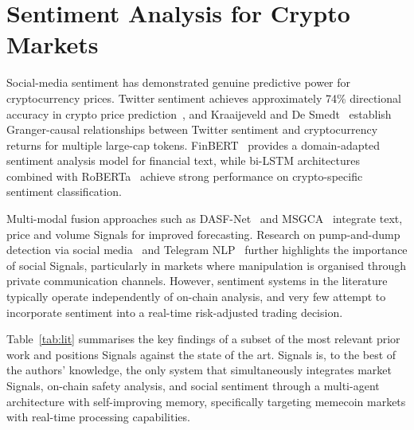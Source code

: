 \documentclass[12pt,a4paper,oneside,openany]{book}
\begin{document}
\section{Sentiment Analysis for Crypto Markets}
Social-media sentiment has demonstrated genuine predictive power for cryptocurrency prices. Twitter sentiment achieves approximately 74\% directional accuracy in crypto price prediction~\cite{ref8}, and Kraaijeveld and De Smedt~\cite{ref9} establish Granger-causal relationships between Twitter sentiment and cryptocurrency returns for multiple large-cap tokens. FinBERT~\cite{ref40} provides a domain-adapted sentiment analysis model for financial text, while bi-LSTM architectures combined with RoBERTa~\cite{ref41} achieve strong performance on crypto-specific sentiment classification.

Multi-modal fusion approaches such as DASF-Net~\cite{ref42} and MSGCA~\cite{ref22} integrate text, price and volume Signals for improved forecasting. Research on pump-and-dump detection via social media~\cite{ref43} and Telegram NLP~\cite{ref44} further highlights the importance of social Signals, particularly in markets where manipulation is organised through private communication channels. However, sentiment systems in the literature typically operate independently of on-chain analysis, and very few attempt to incorporate sentiment into a real-time risk-adjusted trading decision.

Table~\ref{tab:lit} summarises the key findings of a subset of the most relevant prior work and positions Signals against the state of the art. Signals is, to the best of the authors' knowledge, the only system that simultaneously integrates market Signals, on-chain safety analysis, and social sentiment through a multi-agent architecture with self-improving memory, specifically targeting memecoin markets with real-time processing capabilities.
\end{document}
